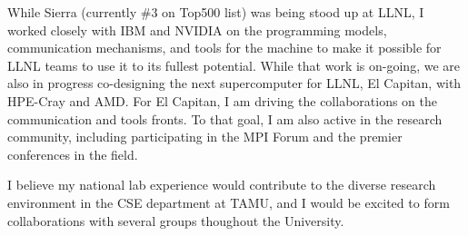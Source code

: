 \documentclass[10pt,letterpaper]{moderncv/moderncv}
\begin{document}
While Sierra (currently \#3 on Top500 list) was being stood up at LLNL, I worked closely with IBM and NVIDIA on the programming models,
communication mechanisms, and tools for the machine to make it possible for LLNL teams to use it to its fullest potential.
While that work is on-going, we are also in progress co-designing the next supercomputer for LLNL, El Capitan, with HPE-Cray and AMD.
For El Capitan, I am driving the collaborations on the communication and tools fronts.  To that goal,
I am also active in the research community, including participating in the MPI Forum and the premier conferences in the field.

I believe my national lab experience would contribute to the diverse research environment in the CSE department at TAMU, and I would be excited to form collaborations with several groups thoughout the University.



\end{document}
